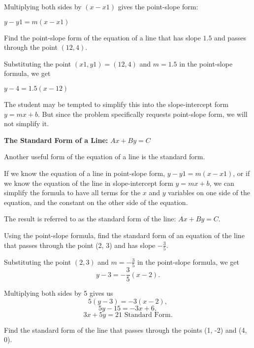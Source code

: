 Multiplying both sides by $(x - x1)$ gives the point-slope form:

$y - y1 = m(x - x1)$

\begin{example}
Find the point-slope form of the equation of a line that has slope $1.5$ and passes through the point $(12,4)$.
\end{example}

\begin{solution}
Substituting the point $(x1, y1) = (12,4)$ and $m= 1.5$ in the point-slope formula, we get

$y - 4 = 1.5(x - 12)$

The student may be tempted to simplify this into the slope-intercept form $y = mx + b$. But since the problem specifically requests point-slope form, we will not simplify it.
\end{solution}

\textbf{The Standard Form of a Line:} $Ax + By = C$

Another useful form of the equation of a line is the standard form.

If we know the equation of a line in point-slope form, $y - y1 = m(x - x1)$, or if we know the equation of the line in slope-intercept form $y = mx + b$, we can simplify the formula to have all terms for the $x$ and $y$ variables on one side of the equation, and the constant on the other side of the equation.

The result is referred to as the standard form of the line: $Ax + By = C$.

\begin{example}
Using the point-slope formula, find the standard form of an equation of the line that passes through the point (2, 3) and has slope $-\frac{3}{5}$.
\end{example}

\begin{solution}
Substituting the point $(2, 3)$ and $m = -\frac{3}{5}$ in the point-slope formula, we get
\[y - 3 = -\frac{3}{5}(x - 2).\]

Multiplying both sides by 5 gives us
\[5(y - 3) = -3(x - 2),\]
\[5y - 15 = -3x + 6,\]
\[3x + 5y = 21 \text{ Standard Form}.\]
\end{solution}


\begin{example}
Find the standard form of the line that passes through the points (1, -2) and (4, 0).
\end{example}


